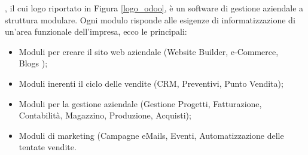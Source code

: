 , il cui logo riportato in Figura \ref{logo_odoo}, è un software di gestione aziendale a struttura modulare.
Ogni modulo risponde alle esigenze di informatizzazione di un'area
funzionale dell'impresa, ecco le principali:
\begin{itemize}
	\item Moduli per creare il sito web aziendale (Website Builder, e-Commerce,\\ Blogs );
	\item Moduli inerenti il ciclo delle vendite (CRM, Preventivi, Punto Vendita);
	\item Moduli per la gestione aziendale (Gestione Progetti, Fatturazione, Contabilità, Magazzino, Produzione, Acquisti);
	\item Moduli di marketing (Campagne eMails, Eventi, Automatizzazione delle tentate vendite.
\end{itemize}